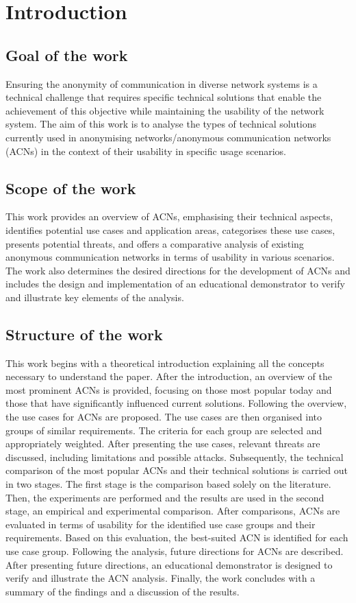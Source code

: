 \chapter{Introduction}

\section{Goal of the work}
Ensuring the anonymity of communication in diverse network systems is a technical challenge that requires specific technical solutions that enable the achievement of this objective while maintaining the usability of the network system. The aim of this work is to analyse the types of technical solutions currently used in anonymising networks/anonymous communication networks (ACNs) in the context of their usability in specific usage scenarios.

\section{Scope of the work}
This work provides an overview of ACNs, emphasising their technical aspects, identifies potential use cases and application areas, categorises these use cases, presents potential threats, and offers a comparative analysis of existing anonymous communication networks in terms of usability in various scenarios. The work also determines the desired directions for the development of ACNs and includes the design and implementation of an educational demonstrator to verify and illustrate key elements of the analysis.

\section{Structure of the work}
This work begins with a theoretical introduction explaining all the concepts necessary to understand the paper.
After the introduction, an overview of the most prominent ACNs is provided, focusing on those most popular today and those that have significantly influenced current solutions.
Following the overview, the use cases for ACNs are proposed. The use cases are then organised into groups of similar requirements. The criteria for each group are selected and appropriately weighted.
After presenting the use cases, relevant threats are discussed, including limitations and possible attacks.
Subsequently, the technical comparison of the most popular ACNs and their technical solutions is carried out in two stages. The first stage is the comparison based solely on the literature. Then, the experiments are performed and the results are used in the second stage, an empirical and experimental comparison.
After comparisons, ACNs are evaluated in terms of usability for the identified use case groups and their requirements. Based on this evaluation, the best-suited ACN is identified for each use case group.
Following the analysis, future directions for ACNs are described.
After presenting future directions, an educational demonstrator is designed to verify and illustrate the ACN analysis.
Finally, the work concludes with a summary of the findings and a discussion of the results.
